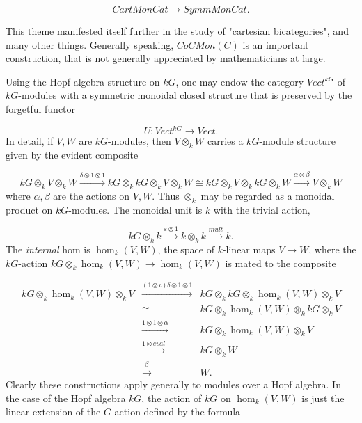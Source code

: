 \documentclass[12pt,titlepage]{article}
\newcommand{\itexarray}[1]{\begin{matrix}#1\end{matrix}}
\theoremstyle{plain}
\theoremstyle{definition}
\theoremstyle{remark}
\begin{document}
\begin{displaymath}
CartMonCat \to SymmMonCat.
\end{displaymath}

This theme manifested itself further in the study of "cartesian
bicategories", and many other things.
Generally speaking, $CoCMon(C)$ is an important construction, that is not
generally appreciated by mathematicians at large.

Using the Hopf algebra structure on $k G$, one may endow the category $Vect^{k G}$ of $k G$-modules with a symmetric monoidal closed structure that is preserved by the forgetful functor

\begin{displaymath}
U: Vect^{k G} \to Vect.
\end{displaymath}
In detail, if $V, W$ are $k G$-modules, then $V \otimes_k W$ carries a $k G$-module structure given by the evident composite

\begin{displaymath}
k G \otimes_k V \otimes_k W \stackrel{\delta \otimes 1 \otimes 1}{\to} k G \otimes_k k G \otimes_k V \otimes_k W \cong k G \otimes_k V \otimes_k k G \otimes_k W \stackrel{\alpha \otimes \beta}{\to} V \otimes_k W
\end{displaymath}
where $\alpha, \beta$ are the actions on $V, W$. Thus $\otimes_k$ may be regarded as a monoidal product on $k G$-modules. The monoidal unit is $k$ with the trivial action,

\begin{displaymath}
k G \otimes_k k \stackrel{\varepsilon \otimes 1}{\to} k \otimes_k k \stackrel{mult}{\to} k.
\end{displaymath}
The \emph{internal} hom is $\hom_k(V, W)$, the space of $k$-linear maps $V \to W$, where the $k G$-action $k G \otimes_k \hom_k(V, W) \to \hom_k(V, W)$ is mated to the composite

\begin{displaymath}
\itexarray{
k G \otimes_k \hom_k(V, W) \otimes_k V & \stackrel{(1 \otimes \iota)\delta \otimes 1 \otimes 1}{\to} & k G \otimes_k k G \otimes_k \hom_k(V, W) \otimes_k V \\
 & \cong & k G \otimes_k \hom_k(V, W) \otimes_k k G \otimes_k V \\ 
 & \stackrel{1 \otimes 1 \otimes \alpha}{\to} & k G \otimes_k \hom_k(V, W) \otimes_k V \\ 
 & \stackrel{1 \otimes eval}{\to} & k G \otimes_k W \\ 
 & \stackrel{\beta}{\to} & W.
}
\end{displaymath}
Clearly these constructions apply generally to modules over a Hopf algebra. In the case of the Hopf algebra $k G$, the action of $k G$ on $\hom_k(V, W)$ is just the linear extension of the $G$-action defined by the formula
\end{document}
